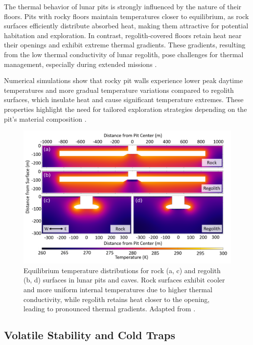 The thermal behavior of lunar pits is strongly influenced by the nature of their floors. Pits with rocky floors maintain temperatures closer to equilibrium, as rock surfaces efficiently distribute absorbed heat, making them attractive for potential habitation and exploration. In contrast, regolith-covered floors retain heat near their openings and exhibit extreme thermal gradients. These gradients, resulting from the low thermal conductivity of lunar regolith, pose challenges for thermal management, especially during extended missions \cite{thermal-lunar-pits, newer-thermal}.

Numerical simulations show that rocky pit walls experience lower peak daytime temperatures and more gradual temperature variations compared to regolith surfaces, which insulate heat and cause significant temperature extremes. These properties highlight the need for tailored exploration strategies depending on the pit's material composition \cite{thermal-lunar-pits, lunar-pits-numerical-modelling}.

\begin{figure}[H]
    \centering
    \includegraphics[width=0.8\linewidth]{thermal-simulation-lunar-pits-2d-regolith-rock.png}
    \caption{Equilibrium temperature distributions for rock (a, c) and regolith (b, d) surfaces in lunar pits and caves. Rock surfaces exhibit cooler and more uniform internal temperatures due to higher thermal conductivity, while regolith retains heat closer to the opening, leading to pronounced thermal gradients. Adapted from \cite{thermal-lunar-pits}.}
    \label{fig:lunar-pit-equilibrium-temps}
\end{figure}


\subsection{Volatile Stability and Cold Traps}

